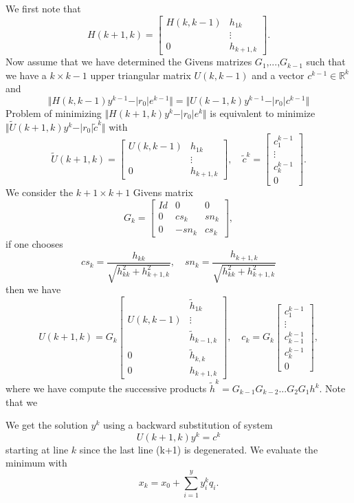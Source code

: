 \documentclass[12pt,a4 paper]{article}
\begin{document}
 We first note that
$$
H(k+1,k)=\left [ \begin{array}{cc}
H(k,k-1) & h_{1k} \\
         &  \vdots \\
0        & h_{k+1,k}
\end{array} \right ].
$$
Now assume that we have determined the Givens matrizes $G_1$,...,$G_{k-1}$ such that we have
a $k\times k-1$ upper triangular matrix $U(k,k-1)$ and a vector $c^{k-1} \in\mathbb R^k$ and 
$$
\Vert H(k,k-1)y^{k-1}-\vert r_0\vert e^{k-1}\Vert=\Vert U(k-1,k)y^{k-1}-\vert r_0\vert c^{k-1}\Vert
$$
Problem of minimizing $\Vert H(k+1,k)y^k-\vert r_0\vert e^{k}\Vert$ is equivalent to minimize
$\Vert \widetilde U(k+1,k) y^k -\vert r_0\vert \widetilde c^{k}\Vert$
with
$$
\widetilde U(k+1,k)=\left [ \begin{array}{cc}
U(k,k-1) & h_{1k} \\
         &  \vdots \\
0        & h_{k+1,k}
\end{array} \right ], \quad 
\widetilde c^{k}=\left [ \begin{array}{c} c^{k-1}_1 \\ \vdots \\c^{k-1}_k\\0 \end{array} \right ].
$$
We consider the $k+1\times k+1$ Givens matrix
$$
G_k=\left [ \begin{array}{ccc}
Id & 0 & 0 \\
0  & cs_k & sn_k \\
0  &-sn_k & cs_k
\end{array} \right ],
$$
if one chooses 
$$
cs_k=\frac{h_{kk}}{\sqrt{h_{kk}^2+h_{k+1,k}^2}}, \quad sn_k=\frac{h_{k+1,k}}{\sqrt{h_{kk}^2+h_{k+1,k}^2}}
$$
then we have
$$
U(k+1,k)=G_k\left [ \begin{array}{cc}
         & \widetilde h_{1k} \\
U(k,k-1) & \vdots \\
         & \widetilde h_{k-1,k} \\
0        & \widetilde h_{k,k} \\
0        & h_{k+1,k}
\end{array} \right ], \quad 
 c_{k}=G_k\left [ \begin{array}{c} c^{k-1}_1 \\ \vdots \\c^{k-1}_{k-1} \\ 
c^{k-1}_{k}\\
0
 \end{array} \right ],
$$
where we have compute the successive products $\widetilde {h}^k=G_{k-1}G_{k-2}...G_2G_1 h^k$.
Note that we 


We get the solution $y^k$ using a backward substitution of system 
$$
U(k+1,k) y^k= c^k
$$ 
starting at line $k$ since the last line (k+1) is degenerated.
We evaluate the minimum with
$$
x_k=x_0+\sum_{i=1}^y y^k_i q_i.
$$
\end{document}
